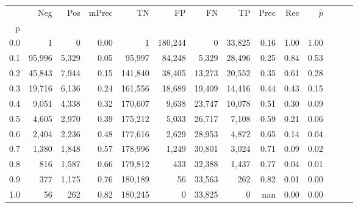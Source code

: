 \begin{tabular}{rrrrrrrrrrrrrr}
\toprule
{} &     Neg &    Pos & mPrec &       TN &       FP &      FN &      TP &  Prec &   Rec & $\hat{p}$ \\
p   &         &        &       &          &          &         &         &       &       &           \\
\midrule
0.0 &       1 &      0 &  0.00 &        1 &  180,244 &       0 &  33,825 &  0.16 &  1.00 &      1.00 \\
0.1 &  95,996 &  5,329 &  0.05 &   95,997 &   84,248 &   5,329 &  28,496 &  0.25 &  0.84 &      0.53 \\
0.2 &  45,843 &  7,944 &  0.15 &  141,840 &   38,405 &  13,273 &  20,552 &  0.35 &  0.61 &      0.28 \\
0.3 &  19,716 &  6,136 &  0.24 &  161,556 &   18,689 &  19,409 &  14,416 &  0.44 &  0.43 &      0.15 \\
0.4 &   9,051 &  4,338 &  0.32 &  170,607 &    9,638 &  23,747 &  10,078 &  0.51 &  0.30 &      0.09 \\
0.5 &   4,605 &  2,970 &  0.39 &  175,212 &    5,033 &  26,717 &   7,108 &  0.59 &  0.21 &      0.06 \\
0.6 &   2,404 &  2,236 &  0.48 &  177,616 &    2,629 &  28,953 &   4,872 &  0.65 &  0.14 &      0.04 \\
0.7 &   1,380 &  1,848 &  0.57 &  178,996 &    1,249 &  30,801 &   3,024 &  0.71 &  0.09 &      0.02 \\
0.8 &     816 &  1,587 &  0.66 &  179,812 &      433 &  32,388 &   1,437 &  0.77 &  0.04 &      0.01 \\
0.9 &     377 &  1,175 &  0.76 &  180,189 &       56 &  33,563 &     262 &  0.82 &  0.01 &      0.00 \\
1.0 &      56 &    262 &  0.82 &  180,245 &        0 &  33,825 &       0 &   nan &  0.00 &      0.00 \\
\bottomrule
\end{tabular}

